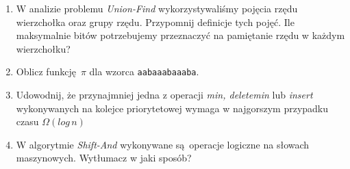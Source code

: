 \documentclass[12pt]{article}
\begin{document}
\begin{enumerate}
    \item{W analizie problemu \textit{Union-Find} wykorzystywaliśmy pojęcia rzędu
    wierzchołka oraz grupy rzędu. Przypomnij definicje tych pojęć. Ile maksymalnie
    bitów potrzebujemy przeznaczyć na pamiętanie rzędu w każdym wierzchołku?}

    \item{Oblicz funkcję $\pi$ dla wzorca \texttt{aabaaabaaaba}.}

    \item{Udowodnij, że przynajmniej jedna z operacji \textit{min, deletemin} lub \textit{insert}
    wykonywanych na kolejce priorytetowej wymaga w najgorszym przypadku czasu $\Omega(log\,n)$}

    \item{W algorytmie \textit{Shift-And} wykonywane są operacje logiczne na
    słowach maszynowych. Wytłumacz w jaki sposób?}
\end{enumerate}
\end{document}
